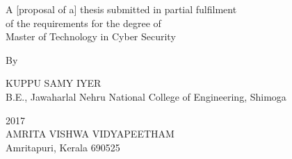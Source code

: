 \thispagestyle{empty}
\begin{center}

{\bf\Huge \thesisTitle}

\par\vskip 4cm

A  [proposal of a] thesis submitted in partial fulfilment\\
of the requirements for the degree of\\
Master of Technology in Cyber Security\\  %

\par\vskip 2cm
By\\
\par\vskip 2cm


KUPPU SAMY IYER\\              %
B.E., Jawaharlal Nehru National College of Engineering, Shimoga\\


\vfill

2017\\                          %
AMRITA VISHWA VIDYAPEETHAM\\
Amritapuri, Kerala 690525\\


\end{center}

\newpage

